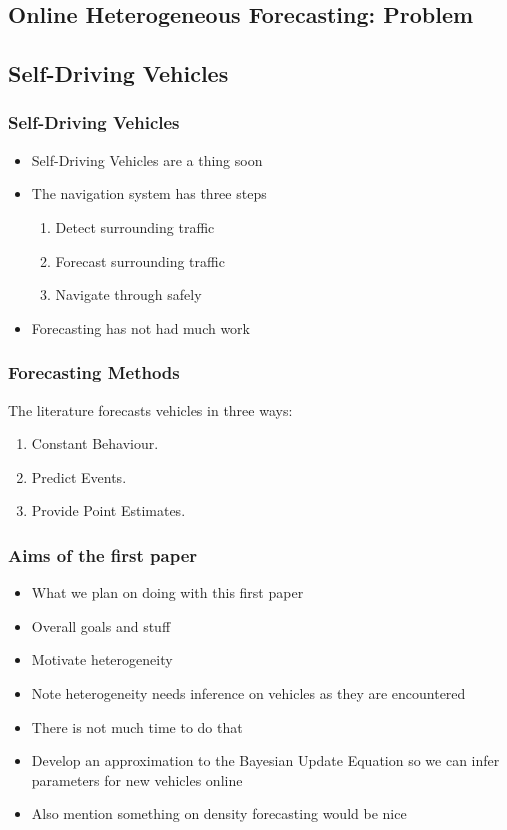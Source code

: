 \documentclass[11pt]{beamer}\usepackage[]{graphicx}\usepackage[]{color}
\begin{document}
\begin{frame}
\section{Online Heterogeneous Forecasting: Problem}
\subsection{Self-Driving Vehicles}
\frametitle{Self-Driving Vehicles}
\begin{itemize}
\item Self-Driving Vehicles are a thing soon
\item The navigation system has three steps
\begin{enumerate}
\item Detect surrounding traffic
\item Forecast surrounding traffic
\item Navigate through safely
\end{enumerate}
\item Forecasting has not had much work
\end{itemize}
\end{frame}

\begin{frame}
\frametitle{Forecasting Methods}
The literature forecasts vehicles in three ways:
\begin{enumerate}
\item Constant Behaviour.
\item Predict Events.
\item Provide Point Estimates.
\end{enumerate}
\end{frame}

\begin{frame}
\frametitle{Aims of the first paper}
\begin{itemize}
\item What we plan on doing with this first paper
\item Overall goals and stuff
\item Motivate heterogeneity
\item Note heterogeneity needs inference on vehicles as they are encountered
\item There is not much time to do that
\item Develop an approximation to the Bayesian Update Equation so we can infer parameters for new vehicles online
\item Also mention something on density forecasting would be nice
\end{itemize}
\end{frame}
\end{document}
